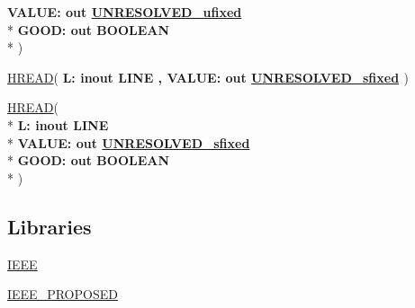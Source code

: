 \begin{DoxyCompactItemize}
  {\bfseries \textcolor{vhdlchar}{ }\textcolor{vhdlchar}{V\+A\+L\+U\+E\+: }\textcolor{stringliteral}{} {\bfseries \textcolor{keywordflow}{out}\textcolor{vhdlchar}{ }{\bfseries \hyperlink{classfixed__pkg_ae78bc2b36d22f6abeac163955e8a587d}{U\+N\+R\+E\+S\+O\+L\+V\+E\+D\+\_\+ufixed}} \textcolor{vhdlchar}{ }}}\\*
  {\bfseries \textcolor{vhdlchar}{ }\textcolor{vhdlchar}{G\+O\+O\+D\+: }\textcolor{stringliteral}{} {\bfseries \textcolor{keywordflow}{out}\textcolor{vhdlchar}{ }\textcolor{comment}{B\+O\+O\+L\+E\+A\+N}\textcolor{vhdlchar}{ }}}\\*
   )
\item 
{\bfseries {\bfseries \textcolor{vhdlchar}{ }}} \hyperlink{classfixed__pkg_a32e9f65860805423413af60fab3bddee}{H\+R\+E\+A\+D}( {\bfseries \textcolor{vhdlchar}{ }\textcolor{vhdlchar}{L\+: }\textcolor{stringliteral}{} {\bfseries \textcolor{keywordflow}{inout}\textcolor{vhdlchar}{ }\textcolor{vhdlchar}{L\+I\+N\+E}\textcolor{vhdlchar}{ }}}{\bfseries ,\textcolor{vhdlchar}{ }\textcolor{vhdlchar}{V\+A\+L\+U\+E\+: }\textcolor{stringliteral}{} {\bfseries \textcolor{keywordflow}{out}\textcolor{vhdlchar}{ }{\bfseries \hyperlink{classfixed__pkg_aa723b28a027c3c0f9bca02d75e8df4d6}{U\+N\+R\+E\+S\+O\+L\+V\+E\+D\+\_\+sfixed}} \textcolor{vhdlchar}{ }}} )
\item 
{\bfseries {\bfseries \textcolor{vhdlchar}{ }}} \hyperlink{classfixed__pkg_abd2fa8e7226ac69f2ec1646ed64652af}{H\+R\+E\+A\+D}( \\*
{\bfseries \textcolor{vhdlchar}{ }\textcolor{vhdlchar}{L\+: }\textcolor{stringliteral}{} {\bfseries \textcolor{keywordflow}{inout}\textcolor{vhdlchar}{ }\textcolor{vhdlchar}{L\+I\+N\+E}\textcolor{vhdlchar}{ }}}\\*
  {\bfseries \textcolor{vhdlchar}{ }\textcolor{vhdlchar}{V\+A\+L\+U\+E\+: }\textcolor{stringliteral}{} {\bfseries \textcolor{keywordflow}{out}\textcolor{vhdlchar}{ }{\bfseries \hyperlink{classfixed__pkg_aa723b28a027c3c0f9bca02d75e8df4d6}{U\+N\+R\+E\+S\+O\+L\+V\+E\+D\+\_\+sfixed}} \textcolor{vhdlchar}{ }}}\\*
  {\bfseries \textcolor{vhdlchar}{ }\textcolor{vhdlchar}{G\+O\+O\+D\+: }\textcolor{stringliteral}{} {\bfseries \textcolor{keywordflow}{out}\textcolor{vhdlchar}{ }\textcolor{comment}{B\+O\+O\+L\+E\+A\+N}\textcolor{vhdlchar}{ }}}\\*
   )
\end{DoxyCompactItemize}
\subsection*{Libraries}
 \begin{DoxyCompactItemize}
\item 
\hyperlink{classfixed__pkg_ae4f03c286607f3181e16b9aa12d0c6d4}{I\+E\+E\+E} 
\item 
\hyperlink{classfixed__pkg_afc0ff76b37aaa16d6649c604fc6db467}{I\+E\+E\+E\+\_\+\+P\+R\+O\+P\+O\+S\+E\+D} 
\end{DoxyCompactItemize}
